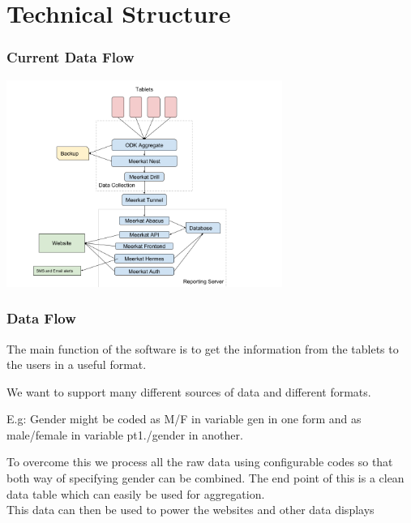 \documentclass{beamer}
\begin{document}
\section{Technical Structure}
\begin{frame}
  \frametitle{Current Data Flow}
  \begin{center}
    \includegraphics[width=9cm]{data_flow.png}
  \end{center}
\end{frame}


\begin{frame}
  \frametitle{Data Flow}
  The main function of the software is to get the information from the tablets to the users in a useful format. \\
  \vspace{10pt}

  We want to support many different sources of data and different formats. \\

    \vspace{10pt}
  
  E.g: Gender might be coded as M/F in variable gen in one form and as male/female in variable pt1./gender in another. \\

    \vspace{10pt}
  
    To overcome this we process all the raw data using configurable codes so that both way of specifying gender can be combined. The end point of this is a clean data table which can easily be used for aggregation. \\

    \vspace{10pt}
    This data can then be used to power the websites and other data displays

    
  \end{frame}
\end{document}
